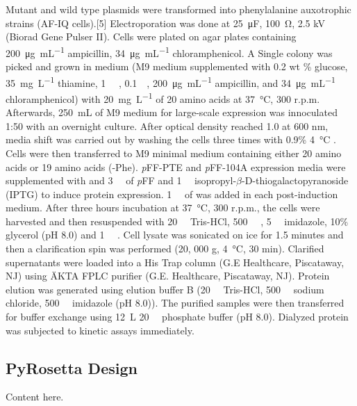 \begin{refsection}
Mutant and wild type plasmids were transformed into  phenylalanine
auxotrophic strains (AF-IQ cells).[5] Electroporation was done at
\SI{25}{\micro\farad}, \SI{100}{\ohm}, 2.5 kV (Biorad Gene Pulser II). Cells were
plated on agar plates containing \SI{200}{\ug\per\mL} ampicillin, \SI{34}{\ug\per\mL}
chloramphenicol. A Single colony was picked and grown in medium (M9 medium
supplemented with 0.2 wt \% glucose, \SI{35}{\mg\per\L} thiamine, \SI{1}{\milli\Molar}
, \SI{0.1}{\milli\Molar}, \SI{200}{\ug\per\mL} ampicillin, and
\SI{34}{\ug\per\mL} chloramphenicol) with \SI{20}{\mg\per\L} of 20 amino acids
at \SI{37}{\celsius}, 300 r.p.m.  Afterwards, \SI{250}{\mL} of M9 medium for
large-scale expression was innoculated 1:50 with an overnight culture.  After
optical density reached 1.0 at 600 nm, media shift was carried out by washing
the cells three times with 0.9\% \SI{4}{\celsius} .  Cells were then
transferred to M9 minimal medium containing either 20 amino acids or 19 amino
acids (-Phe). \emph{p}FF-PTE and \emph{p}FF-104A expression media were
supplemented with and \SI{3}{\milli\Molar} of \emph{p}FF and
\SI{1}{\milli\Molar} isopropyl-$\beta$-D-thiogalactopyranoside (IPTG) to induce
protein expression.  \SI{1}{\milli\Molar} of  was added in each
post-induction medium. After three hours incubation at \SI{37}{\celsius}, 300
r.p.m., the cells were harvested and then resuspended with
\SI{20}{\milli\Molar} Tris-HCl, \SI{500}{\milli\Molar} ,
\SI{5}{\milli\Molar} imidazole, 10\% glycerol (pH 8.0) and \SI{1}{\micro\Molar}
. Cell lysate was sonicated on ice for 1.5 minutes and then a
clarification spin was performed (20, 000 g, \SI{4}{\celsius}, 30 min).
Clarified supernatants were loaded into a His Trap column (G.E Healthcare,
Piscataway, NJ) using ÄKTA FPLC purifier (G.E.  Healthcare, Piscataway, NJ).
Protein elution was generated using elution buffer B (\SI{20}{\milli\Molar}
Tris-HCl, \SI{500}{\milli\Molar} sodium chloride, \SI{500}{\milli\Molar}
imidazole (pH 8.0)).  The purified samples were then transferred for buffer
exchange using \SI{12}{\L} \SI{20}{\milli\Molar} phosphate buffer (pH 8.0).
Dialyzed protein was subjected to kinetic assays immediately.

\subsection{PyRosetta Design}
\label{sec:rosetta-method}

Content here.


\end{refsection}
